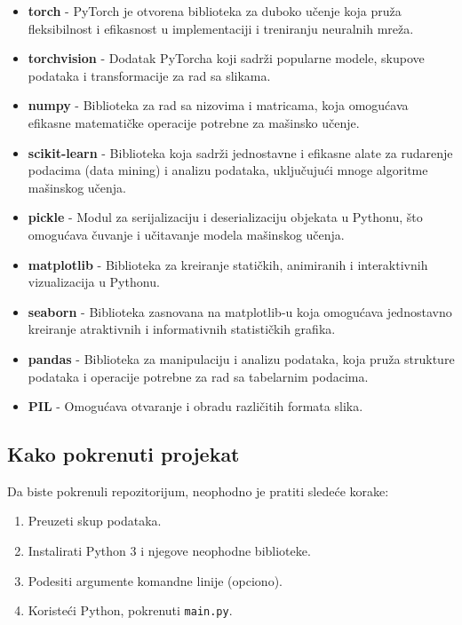 \documentclass{article}
\begin{document}
\begin{itemize}
    \item \textbf{torch} - PyTorch je otvorena biblioteka za duboko učenje koja pruža fleksibilnost i efikasnost u implementaciji i treniranju neuralnih mreža.
    \item \textbf{torchvision} - Dodatak PyTorcha koji sadrži popularne modele, skupove podataka i transformacije za rad sa slikama.
    \item \textbf{numpy} - Biblioteka za rad sa nizovima i matricama, koja omogućava efikasne matematičke operacije potrebne za mašinsko učenje.
    \item \textbf{scikit-learn} - Biblioteka koja sadrži jednostavne i efikasne alate za rudarenje podacima (data mining) i analizu podataka, uključujući mnoge algoritme mašinskog učenja.
    \item \textbf{pickle} - Modul za serijalizaciju i deserializaciju objekata u Pythonu, što omogućava čuvanje i učitavanje modela mašinskog učenja.
    \item \textbf{matplotlib} - Biblioteka za kreiranje statičkih, animiranih i interaktivnih vizualizacija u Pythonu.
    \item \textbf{seaborn} - Biblioteka zasnovana na matplotlib-u koja omogućava jednostavno kreiranje atraktivnih i informativnih statističkih grafika.
    \item \textbf{pandas} - Biblioteka za manipulaciju i analizu podataka, koja pruža strukture podataka i operacije potrebne za rad sa tabelarnim podacima.
    \item \textbf{PIL} - Omogućava otvaranje i obradu različitih formata slika.
\end{itemize}

\subsection{Kako pokrenuti projekat}

Da biste pokrenuli repozitorijum, neophodno je pratiti sledeće korake:

\begin{enumerate}
    \item Preuzeti skup podataka.
    \item Instalirati Python 3 i njegove neophodne biblioteke.
    \item Podesiti argumente komandne linije (opciono).
    \item Koristeći Python, pokrenuti \texttt{main.py}.
\end{enumerate}
\end{document}
